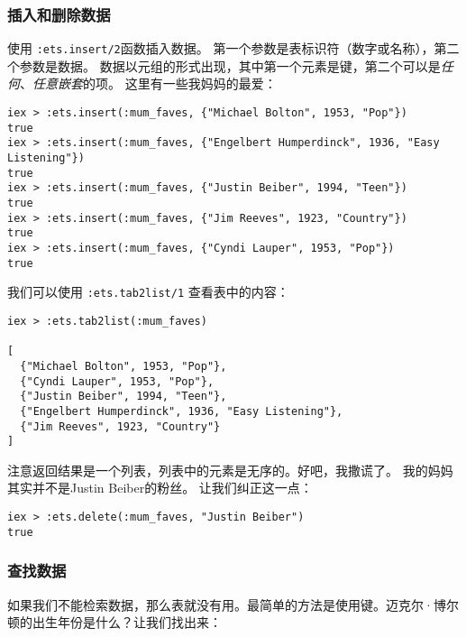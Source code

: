 \subsubsection{插入和删除数据}

使用 \texttt{:ets.insert/2}函数插入数据。
第一个参数是表标识符（数字或名称），第二个参数是数据。
数据以元组的形式出现，其中第一个元素是键，第二个可以是\emph{任何}、\emph{任意嵌套}的项。
这里有一些我妈妈的最爱：

\begin{code}{}\begin{verbatim}
iex > :ets.insert(:mum_faves, {"Michael Bolton", 1953, "Pop"})
true
iex > :ets.insert(:mum_faves, {"Engelbert Humperdinck", 1936, "Easy Listening"})
true
iex > :ets.insert(:mum_faves, {"Justin Beiber", 1994, "Teen"})
true
iex > :ets.insert(:mum_faves, {"Jim Reeves", 1923, "Country"})
true
iex > :ets.insert(:mum_faves, {"Cyndi Lauper", 1953, "Pop"})
true
\end{verbatim}
\end{code}

我们可以使用 \texttt{:ets.tab2list/1} 查看表中的内容：

\begin{code}{}\begin{verbatim}
iex > :ets.tab2list(:mum_faves)

[
  {"Michael Bolton", 1953, "Pop"},
  {"Cyndi Lauper", 1953, "Pop"},
  {"Justin Beiber", 1994, "Teen"},
  {"Engelbert Humperdinck", 1936, "Easy Listening"},
  {"Jim Reeves", 1923, "Country"}
]
\end{verbatim}
\end{code}

注意返回结果是一个列表，列表中的元素是无序的。好吧，我撒谎了。
我的妈妈其实并不是Justin Beiber的粉丝。
让我们纠正这一点：

\begin{code}{}\begin{verbatim}
iex > :ets.delete(:mum_faves, "Justin Beiber")
true
\end{verbatim}
\end{code}


\subsubsection{查找数据}
如果我们不能检索数据，那么表就没有用。最简单的方法是使用键。迈克尔·博尔顿的出生年份是什么？让我们找出来：

